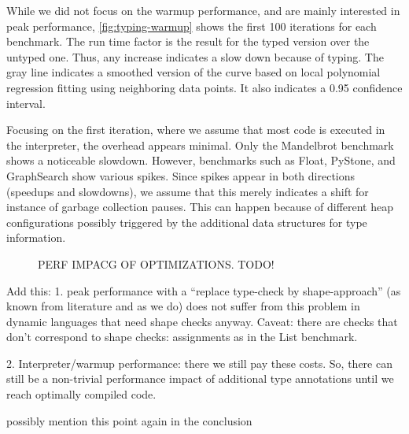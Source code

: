 While we did not focus on the warmup performance,
and are mainly interested in peak performance,
\cref{fig:typing-warmup} shows the first 100 iterations for each benchmark.
The run time factor is the result for the typed version over the untyped one.
Thus, any increase indicates a slow down because of typing.
The gray line indicates a smoothed version of the curve
based on local polynomial regression fitting\citep{Cleveland:1992}
using neighboring data points.
It also indicates a 0.95 confidence interval.

Focusing on the first iteration,
where we assume that most code is executed in the interpreter,
the overhead appears minimal.
Only the Mandelbrot benchmark shows a noticeable slowdown.
However, benchmarks such as Float, PyStone, and GraphSearch show various spikes.
Since spikes appear in both directions (speedups and slowdowns),
we assume that this merely indicates a shift
for instance of garbage collection pauses.
This can happen because of different heap configurations
possibly triggered by the additional data structures for type information.



%
%

\begin{figure}
	\OptimizationOverview{}
	\caption{PERF  IMPACG OF OPTIMIZATIONS. TODO!}
	\label{fig:perf-impact-optimization}
\end{figure}



\begin{note}
Add this:
1. peak performance with a “replace type-check by shape-approach” (as known from literature and as we do) does not suffer from this problem in dynamic languages that need shape checks anyway.
Caveat: there are checks that don’t correspond to shape checks: assignments as in the List benchmark.

2. Interpreter/warmup performance: there we still pay these costs. So, there can still be a non-trivial performance impact of additional type annotations until we reach optimally compiled code.

possibly mention this point again in the conclusion
\end{note}



